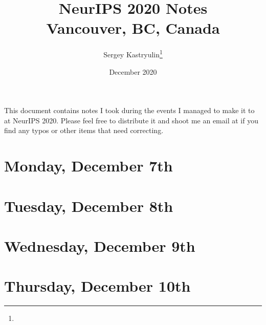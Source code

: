 \documentclass[11pt]{article}
\title{NeurIPS 2020 Notes \\ \Large{Vancouver, BC, Canada}}
\author{Sergey Kastryulin\footnote{\durl{https://github.com/snk4tr}} \\ \durl{snk4tr@gmail.com}}
\date{December 2020}
\begin{document}
\maketitle
\tableofcontents
\newpage


This document contains notes I took during the events I managed to make it to at NeurIPS 2020. Please feel free to distribute it and shoot me an email at  if you find any typos or other items that need correcting. \\




\newpage
\section{Monday, December 7th}


\newpage
\section{Tuesday, December 8th}


\newpage
\section{Wednesday, December 9th}


\newpage
\section{Thursday, December 10th}



\newpage


\end{document}
